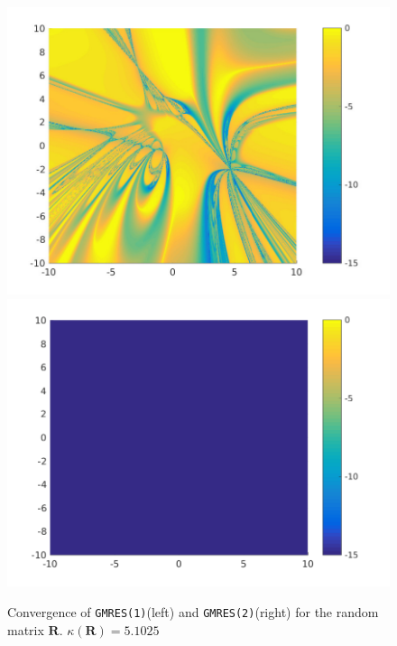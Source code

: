 \begin{frame}
\begin{figure}
\centering
\includegraphics[width=0.45\linewidth]{../images/randAGMRES1}
\includegraphics[width=0.45\linewidth]{../images/randAGMRES2}
\caption{Convergence of \texttt{GMRES(1)}(left) and \texttt{GMRES(2)}(right) for the random matrix $\mathbf{R}$. $\kappa(\mathbf{R}) = 5.1025$ }
\label{fig:randAGMRES2}
\end{figure}
\end{frame}


